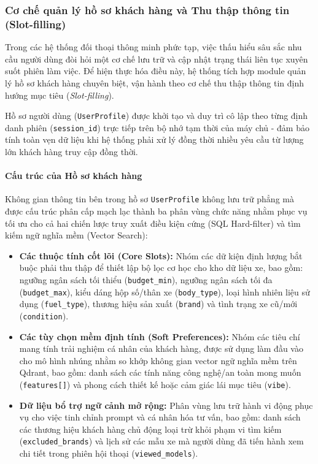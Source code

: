 \subsubsection{Cơ chế quản lý hồ sơ khách hàng và Thu thập thông tin (Slot-filling)}

Trong các hệ thống đối thoại thông minh phức tạp, việc thấu hiểu sâu sắc nhu cầu người dùng đòi hỏi một cơ chế lưu trữ và cập nhật trạng thái liên tục xuyên suốt phiên làm việc. Để hiện thực hóa điều này, hệ thống tích hợp module quản lý hồ sơ khách hàng chuyên biệt, vận hành theo cơ chế thu thập thông tin định hướng mục tiêu (\textit{Slot-filling}). 

Hồ sơ người dùng (\texttt{UserProfile}) được khởi tạo và duy trì cô lập theo từng định danh phiên (\texttt{session\_id}) trực tiếp trên bộ nhớ tạm thời của máy chủ - đảm bảo tính toàn vẹn dữ liệu khi hệ thống phải xử lý đồng thời nhiều yêu cầu từ lượng lớn khách hàng truy cập đồng thời.

\paragraph{Cấu trúc của Hồ sơ khách hàng}

Không gian thông tin bên trong hồ sơ \texttt{UserProfile} không lưu trữ phẳng mà được cấu trúc phân cấp mạch lạc thành ba phân vùng chức năng nhằm phục vụ tối ưu cho cả hai chiến lược truy xuất điều kiện cứng (SQL Hard-filter) và tìm kiếm ngữ nghĩa mềm (Vector Search):

\begin{itemize}
    \item \textbf{Các thuộc tính cốt lõi (Core Slots):} Nhóm các dữ kiện định lượng bắt buộc phải thu thập để thiết lập bộ lọc cơ học cho kho dữ liệu xe, bao gồm: ngưỡng ngân sách tối thiểu (\texttt{budget\_min}), ngưỡng ngân sách tối đa (\texttt{budget\_max}), kiểu dáng hộp số/thân xe (\texttt{body\_type}), loại hình nhiên liệu sử dụng (\texttt{fuel\_type}), thương hiệu sản xuất (\texttt{brand}) và tình trạng xe cũ/mới (\texttt{condition}).
    
    \item \textbf{Các tùy chọn mềm định tính (Soft Preferences):} Nhóm các tiêu chí mang tính trải nghiệm cá nhân của khách hàng, được sử dụng làm đầu vào cho mô hình nhúng nhằm so khớp không gian vector ngữ nghĩa mềm trên Qdrant, bao gồm: danh sách các tính năng công nghệ/an toàn mong muốn (\texttt{features[]}) và phong cách thiết kế hoặc cảm giác lái mục tiêu (\texttt{vibe}).
    
    \item \textbf{Dữ liệu bổ trợ ngữ cảnh mở rộng:} Phân vùng lưu trữ hành vi động phục vụ cho việc tinh chỉnh prompt và cá nhân hóa tư vấn, bao gồm: danh sách các thương hiệu khách hàng chủ động loại trừ khỏi phạm vi tìm kiếm (\texttt{excluded\_brands}) và lịch sử các mẫu xe mà người dùng đã tiến hành xem chi tiết trong phiên hội thoại (\texttt{viewed\_models}).
\end{itemize}

